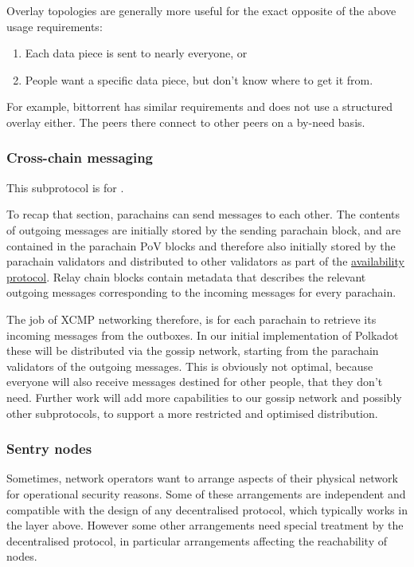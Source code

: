 Overlay topologies are generally more useful for the exact opposite of the
above usage requirements:

\begin{enumerate}
\item Each data piece is sent to nearly everyone, or
\item People want a specific data piece, but don't know where to get it from.
\end{enumerate}

For example, bittorrent has similar requirements and does not use a structured
overlay either. The peers there connect to other peers on a by-need basis.

\subsubsection{Cross-chain messaging} \label{sec:net_crosschain}

This subprotocol is for .

To recap that section, parachains can send messages to each other. The contents
of outgoing messages are initially stored by the sending parachain block, and
are contained in the parachain PoV blocks and therefore also initially stored
by the parachain validators and distributed to other validators as part of the
\hyperref[sec:net_storage]{availability protocol}. Relay chain blocks contain
metadata that describes the relevant outgoing messages corresponding to the
incoming messages for every parachain.

The job of XCMP networking therefore, is for each parachain to retrieve its
incoming messages from the outboxes. In our initial implementation of Polkadot
these will be distributed via the gossip network, starting from the parachain
validators of the outgoing messages. This is obviously not optimal, because
everyone will also receive messages destined for other people, that they don't
need. Further work will add more capabilities to our gossip network and
possibly other subprotocols, to support a more restricted and optimised
distribution.

\subsubsection{Sentry nodes} \label{sec:net_sentry}

Sometimes, network operators want to arrange aspects of their physical network
for operational security reasons. Some of these arrangements are independent
and compatible with the design of any decentralised protocol, which typically
works in the layer above. However some other arrangements need special
treatment by the decentralised protocol, in particular arrangements affecting
the reachability of nodes.

